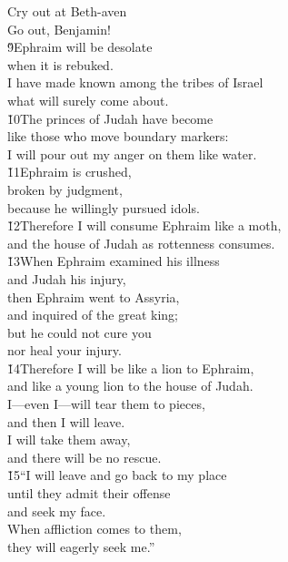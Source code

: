\begin{poetry}
\poeml Cry out at Beth-aven \\
\poemll    Go out, Benjamin! \\
\poeml \v{9}Ephraim will be desolate \\
\poemll    when it is rebuked. \\
\poeml I have made known among the tribes of Israel \\
\poemll    what will surely come about. \\
\poeml \v{10}The princes of Judah have become \\
\poemll    like those who move boundary markers: \\
\poemlll       I will pour out my anger on them like water. \\
\poeml \v{11}Ephraim is crushed, \\
\poemll    broken by judgment, \\
\poemlll       because he willingly pursued idols. \\
\poeml \v{12}Therefore I will consume Ephraim like a moth, \\
\poemll    and the house of Judah as rottenness consumes. \\
\poeml \v{13}When Ephraim examined his illness \\
\poemll    and Judah his injury, \\
\poeml then Ephraim went to Assyria, \\
\poemll    and inquired of the great king; \\
\poeml but he could not cure you \\
\poemll    nor heal your injury. \\
\poeml \v{14}Therefore I will be like a lion to Ephraim, \\
\poemll    and like a young lion to the house of Judah. \\
\poeml I---even I---will tear them to pieces, \\
\poemll    and then I will leave. \\
\poeml I will take them away, \\
\poemll    and there will be no rescue. \\
\poeml \v{15}``I will leave and go back to my place \\
\poemll    until they admit their offense \\
\poemlll       and seek my face. \\
\poeml When affliction comes to them, \\
\poemll    they will eagerly seek me.''
\end{poetry}


